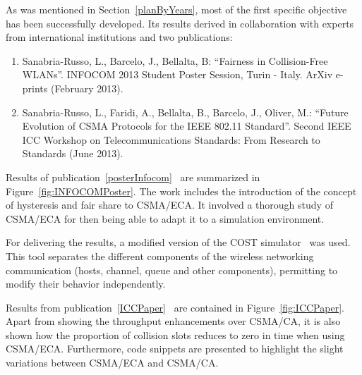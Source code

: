 As was mentioned in Section~\ref{planByYears}, most of the first specific objective has been successfully developed. Its results derived in collaboration with experts from international institutions and two publications:

\begin{enumerate}
	\item Sanabria-Russo, L., Barcelo, J., Bellalta, B: ``Fairness in Collision-Free WLANs''. INFOCOM 2013 Student Poster Session, Turin - Italy. ArXiv e-prints (February 2013).\label{posterInfocom}
	\item Sanabria-Russo, L., Faridi, A., Bellalta, B., Barcelo, J., Oliver, M.: ``Future Evolution of CSMA Protocols for the IEEE 802.11 Standard''. Second IEEE ICC Workshop on Telecommunications Standards: From Research to Standards (June 2013).\label{ICCPaper}
\end{enumerate}

Results of publication~\ref{posterInfocom}~\cite{fairness-ECA} are summarized in Figure~\ref{fig:INFOCOMPoster}. The work includes the introduction of the concept of hysteresis and fair share to CSMA/ECA. It involved a thorough study of CSMA/ECA for then being able to adapt it to a simulation environment. 

For delivering the results, a modified version of the COST simulator~\cite{COST} was used. This tool separates the different components of the wireless networking communication (hosts, channel, queue and other components), permitting to modify their behavior independently.

Results from publication~\ref{ICCPaper}~\cite{research2standards} are contained in Figure~\ref{fig:ICCPaper}. Apart from showing the throughput enhancements over CSMA/CA, it is also shown how the proportion of collision slots reduces to zero in time when using CSMA/ECA. Furthermore, code snippets are presented to highlight the slight variations between CSMA/ECA and CSMA/CA.

